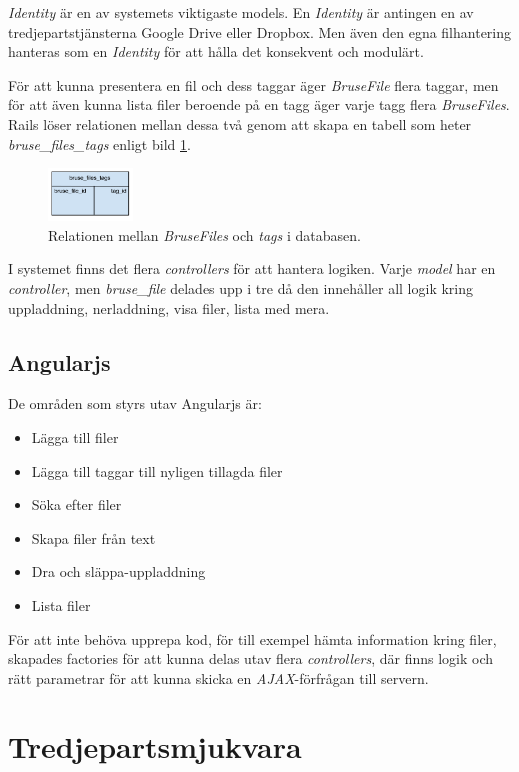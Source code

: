 \emph{Identity} är en av  systemets viktigaste models. En \emph{Identity} är
antingen en av tredjepartstjänsterna Google Drive eller Dropbox. Men även den
egna filhantering hanteras som en \emph{Identity} för att hålla det konsekvent
och modulärt.

För att kunna presentera en fil och dess taggar äger \emph{BruseFile} flera
taggar, men för att även kunna lista filer beroende på en tagg äger varje tagg
flera \emph{BruseFiles}. Rails löser relationen mellan dessa två genom att skapa
en tabell som heter \emph{bruse\_files\_tags} enligt bild
\ref{fig:bruse_files_tags}.

\begin{figure}[!h]
\centering
\includegraphics[width=0.2\textwidth]{figures/bruse_files_tags.png}
\caption{Relationen mellan \emph{BruseFiles} och \emph{tags} i databasen.}
\label{fig:bruse_files_tags}
\end{figure}

I systemet finns det flera \emph{controllers} för att hantera logiken. Varje
\emph{model} har en \emph{controller}, men \emph{bruse\_file} delades upp i tre
då den innehåller all logik kring uppladdning, nerladdning, visa filer, lista
med mera.

\subsection{Angularjs}
De områden som styrs utav Angularjs är:
\begin{itemize}
  \item Lägga till filer
  \item Lägga till taggar till nyligen tillagda filer
  \item Söka efter filer
  \item Skapa filer från text
  \item Dra och släppa-uppladdning
  \item Lista filer
\end{itemize}

För att inte behöva upprepa kod, för till exempel hämta information kring filer,
skapades factories för att kunna delas utav flera \emph{controllers}, där finns
logik och rätt parametrar för att kunna skicka en \emph{AJAX}-förfrågan till
servern.

\section{Tredjepartsmjukvara}

